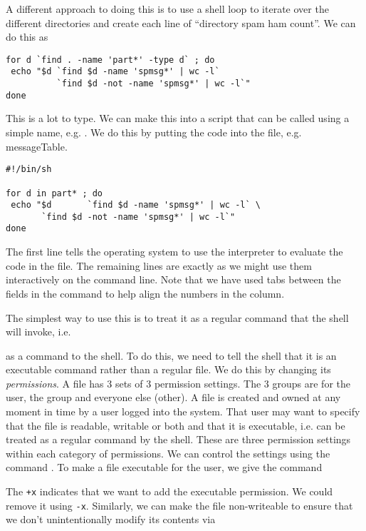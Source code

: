 A different approach to doing this is to use 
a shell loop to iterate over the different directories
and create each line of ``directory spam ham count''.
We can do this as 
\begin{verbatim}
for d `find . -name 'part*' -type d` ; do
 echo "$d `find $d -name 'spmsg*' | wc -l` 
          `find $d -not -name 'spmsg*' | wc -l`"
done
\end{verbatim}

This is a lot to type. We can make this into a script
that can be called using a simple name, e.g. .
We do this by putting the code into the file, e.g. messageTable.
\begin{verbatim}
#!/bin/sh

for d in part* ; do 
 echo "$d       `find $d -name 'spmsg*' | wc -l` \
       `find $d -not -name 'spmsg*' | wc -l`"
done
\end{verbatim}
The first line tells the operating system to use 
the interpreter
 to evaluate the code in the file.
The remaining lines are exactly as we might use them
interactively on the command line.
Note that we have used tabs between the fields
in the  command to help align the numbers in
the column.

The simplest way to use this is
to treat it as a regular command that
the shell will invoke, i.e.
\begin{comment}
  messageTable
\end{comment}
as a command to the shell.
To do this, we need to tell the shell that it is 
an executable command rather than a regular file.
We do this by changing its \textit{permissions}.
A file has 3 sets of 3 permission settings.
The 3 groups are for the user, the group and
everyone else (other).
A file is created and owned at any moment in time
by a user logged into the system. 
That user may want to specify that the file is
readable, writable or both and that it is executable,
i.e. can be treated as a regular command by the shell.
These are three permission settings within each category
of permissions.
We can control the settings using the command
.
To make a file executable for the user, we give the command
\begin{comment}
  chmod +x messageTable
\end{comment}
The \verb|+x| indicates that we want to add the executable
permission. 
We could remove it using \verb|-x|.
Similarly, we can make the file non-writeable to ensure
that we don't unintentionally modify its contents
via
\begin{comment}
  chmod -w messageTable.
\end{comment}

